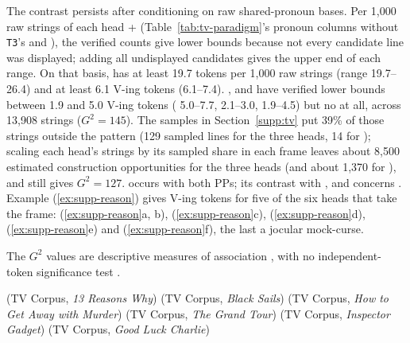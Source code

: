 \documentclass[12pt]{article}
\begin{document}
The contrast persists after conditioning on raw shared-pronoun bases. Per 1,000 raw strings of each head +  (Table~\ref{tab:tv-paradigm}'s pronoun columns without \texttt{T3}'s  and ), the verified counts give lower bounds because not every candidate line was displayed; adding all undisplayed candidates gives the upper end of each range. On that basis,  has at least 19.7  tokens per 1,000 raw strings (range 19.7--26.4) and at least 6.1  V-ing tokens (6.1--7.4). ,  and  have verified lower bounds between 1.9 and 5.0  V-ing tokens ( 5.0--7.7,  2.1--3.0,  1.9--4.5) but no  at all, across 13,908 strings ($G^2 = 145$). The samples in Section~\ref{supp:tv} put 39\% of those strings outside the pattern (129 sampled lines for the three heads, 14 for ); scaling each head's strings by its sampled share in each frame leaves about 8,500 estimated construction opportunities for the three heads (and about 1,370 for ), and still gives $G^2 = 127$.  occurs with both PPs; its contrast with ,  and  concerns . Example (\ref{ex:supp-reason}) gives  V-ing tokens for five of the six heads that take the frame:  (\ref{ex:supp-reason}a, b),  (\ref{ex:supp-reason}c),  (\ref{ex:supp-reason}d),  (\ref{ex:supp-reason}e) and  (\ref{ex:supp-reason}f), the last a jocular mock-curse.

The $G^2$ values are descriptive measures of association \citep{dunning1993}, with no independent-token significance test \citep{kilgarriff2005}.

\ea\label{ex:supp-reason}
\ea {} \hfill (TV Corpus, \emph{13 Reasons Why})
\ex {} \hfill (TV Corpus, \emph{Black Sails})
\ex {} \hfill (TV Corpus, \emph{How to Get Away with Murder})
\ex {} \hfill (TV Corpus, \emph{The Grand Tour})
\ex {} \hfill (TV Corpus, \emph{Inspector Gadget})
\ex {} \hfill (TV Corpus, \emph{Good Luck Charlie})
\z
\z
\end{document}

